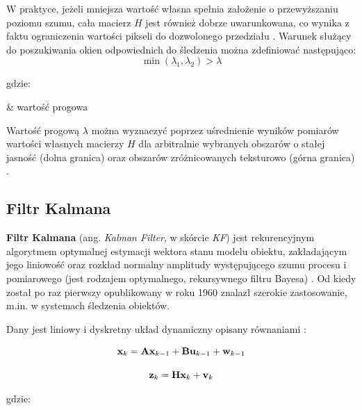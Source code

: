 W praktyce, jeżeli mniejsza wartość własna spełnia założenie o przewyższaniu poziomu szumu, cała macierz $H$ jest również dobrze uwarunkowana, co wynika z faktu ograniczenia wartości pikseli do dozwolonego przedziału \cite{Tomasi1991}. Warunek służący do poszukiwania okien odpowiednich do śledzenia można zdefiniować następująco:
\begin{equation}
\label{equ:Algorytm_Lucasa_Kanade_Tomasi_poszukiwanie_punktow}
	\min (\lambda_1, \lambda_2) > \lambda
\end{equation}

\noindent
gdzie:
\begin{conditions}
	\lambda & wartość progowa \\
\end{conditions}

Wartość progową $\lambda$ można wyznaczyć poprzez uśrednienie wyników pomiarów wartości własnych macierzy $H$ dla arbitralnie wybranych obszarów o stałej jasność (dolna granica) oraz obszarów zróżnicowanych teksturowo (górna granica) \cite{Tomasi1991}.

\subsection{Filtr Kalmana}
\label{subsec:Filtr_Kalmana}

\textbf{Filtr Kalmana} (ang. \textit{Kalman Filter}, w skórcie \textit{KF}) jest rekurencyjnym algorytmem optymalnej estymacji wektora stanu modelu obiektu, zakładającym jego liniowość oraz rozkład normalny amplitudy występującego szumu procesu i pomiarowego (jest rodzajem optymalnego, rekursywnego filtru Bayesa) \cite{Challa2011}. Od kiedy został po raz pierwszy opublikowany w roku 1960 znalazł szerokie zastosowanie, m.in. w systemach śledzenia obiektów.

Dany jest liniowy i dyskretny układ dynamiczny opisany równaniami \cite{Welch1995}:

\begin{equation}
\label{equ:Filtr_Kalmana_rownanie_procesu}
	\mathbf{x}_k = \mathbf{A} \mathbf{x}_{k-1} + \mathbf{B} \mathbf{u}_{k - 1} + \mathbf{w}_{k-1}
\end{equation}

\begin{equation}
\label{equ:Filtr_Kalmana_rownanie_pomiaru}
	\mathbf{z}_k = \mathbf{H} \mathbf{x}_k + \mathbf{v}_k
\end{equation}

\noindent
gdzie:


